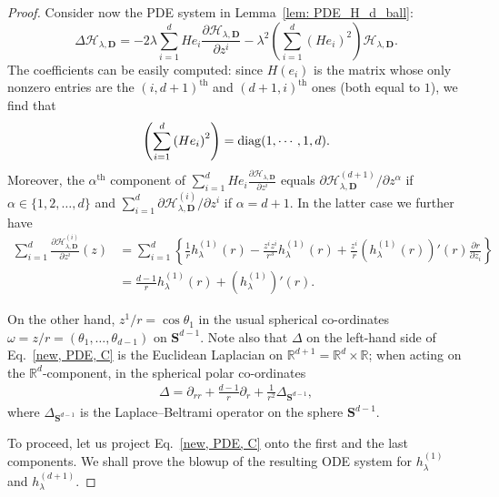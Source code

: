 \documentclass[11pt,a4paper,english,reqno]{amsart}
\theoremstyle{plain}
\newcommand{\R}{\mathbb{R}}
\newcommand{\p}{\partial}
\newcommand{\1}{\mathbbm{1}}
\begin{document}
\begin{proof}
Consider now the PDE system in Lemma~\ref{lem: PDE_H_d_ball}:
\begin{equation}\label{new, PDE, C}
\Delta \mathcal{H}_{\lambda, \mathbf{D}}=-2\lambda\sum_{i=1}^{d}He_{i}\frac{\partial \mathcal{H}_{\lambda, \mathbf{D}}}{\partial z^{i}}-\lambda^{2}\left(\sum_{i=1}^{d}\left(He_{i}\right)^{2}\right)\mathcal{H}_{\lambda, \mathbf{D}}.
\end{equation}
The coefficients can be  easily computed: since $H(e_i)$ is the matrix whose only nonzero entries are the $(i, d+1)^{\text{th}}$ and $(d+1, i)^{\text{th}}$ ones (both equal to $1$), we find that
\begin{equation}\label{proj identity A}
    \left(\sum_{i=1}^{d}\left(He_{i}\right)^{2}\right) = {\rm diag}(1,\cdots,1,d).
\end{equation}
Moreover, the $\alpha^{\text{th}}$ component of  $\sum_{i=1}^{d}He_{i}\frac{\partial \mathcal{H}_{\lambda, \mathbf{D}}}{\partial z^{i}}$ equals $
      {\p \mathcal{H}_{\lambda, \mathbf{D}}^{(d+1)}}\slash{\p z^\alpha}$ if $\alpha\in \{1,2,\ldots,d\}$ and $
      \sum_{i=1}^d \p \mathcal{H}_{\lambda, \mathbf{D}}^{(i)}\slash \p z^i$ if  $\alpha=d+1$. In the latter case we further have
      \begin{align}\label{proj identity B}
    \sum_{i=1}^d \frac{\p \mathcal{H}_{\lambda, \mathbf{D}}^{(i)}}{\p z^i}(z) &=   \sum_{i=1}^d\left\{ \frac{1}{r}h_{\lambda}^{(1)}(r) - \frac{z^i z^i}{r^3}h_{\lambda}^{(1)}(r) + \frac{z^i}{r}\left(h_{\lambda}^{(1)}(r)\right)'(r) \frac{\p r}{\p z_i} \right\}\nonumber \\
   &= \frac{d-1}{r}h_{\lambda}^{(1)}(r)+ \left(h_{\lambda}^{(1)}\right)'(r). 
      \end{align}

On the other hand, $z^1/r=\cos\theta_1$ in the usual spherical co-ordinates $\omega=z/r=(\theta_1, \ldots, \theta_{d-1})$ on $\mathbf{S}^{d-1}$. Note also that $\Delta$ on the left-hand side of Eq.~\eqref{new, PDE, C} is the Euclidean Laplacian on $\R^{d+1}=\R^d\times \R$; when acting on the $\R^d$-component, in the spherical polar co-ordinates 
\begin{align}\label{identity, beltrami}
    \Delta = \p_{rr} + \frac{d-1}{r} \p_r  + \frac{1}{r^2}\Delta_{\mathbf{S}^{d-1}},  
\end{align}
where $\Delta_{\mathbf{S}^{d-1}}$ is the Laplace--Beltrami operator on the sphere $\mathbf{S}^{d-1}$.


To proceed, let us project Eq.~\eqref{new, PDE, C} onto the first and the last components. We shall prove the blowup of the resulting ODE system for $h_\lambda^{(1)}$ and $h_\lambda^{(d+1)}$.




\end{proof}
\end{document}
